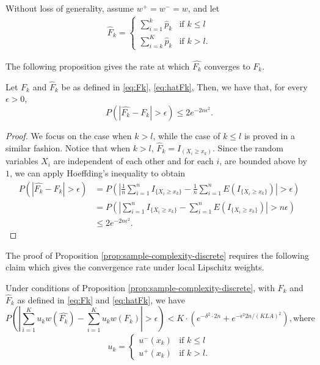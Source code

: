 Without loss of generality, assume $w^+=w^-=w$, and let
\begin{align}
\label{eq:hatFk}
\hat F_k = 
\begin{cases}
   \sum_{i=1}^k \hat p_k & \text{if   } k \leq l \\
   \sum_{i=k}^K \hat p_k & \text{if  }  k > l.
\end{cases}  
\end{align}

The following proposition gives the rate at which $\hat{F_k}$ converges to $F_k$.
\begin{proposition}
\label{prop:hoeffding-discrete}
Let $F_k$ and $\hat F_k$ be as defined in \eqref{eq:Fk}, \eqref{eq:hatFk}, Then, we have that, for every $\epsilon >0$, 
$$P(|\hat{F_k}-F_k| > \epsilon) \leq 2 e^{-2n \epsilon^2}.$$
\end{proposition}
\begin{proof}
We focus on the case when $k > l$, while the case of $k \leq l$ is proved in a similar fashion.
Notice that when $k>l$,  $\hat F_k =I_{(X_i \geq  x_k) }$. Since the random variables $X_i$ are independent of each other and  for each $i$, are bounded above by $1$, we can apply Hoeffding's inequality to obtain 
\begin{align*}
P(\left|\hat{F_k}- F_k \right| > \epsilon) & = P(\left| \frac{1}{n} \sum_{i=1}^n I_{\{X_i \geq
x_k\}} - \frac{1}{n} \sum_{i=1}^n E(I_{\{X_i \geq x_k\}}) \right| > \epsilon) \\ & = P(\left|
\sum_{i=1}^n I_{\{X_i \geq x_k\}} - \sum_{i=1}^n E(I_{\{X_i \geq x_k\}}) \right| > n\epsilon) \\ &
    \leq 2e^{-2n \epsilon^2}.
\end{align*}
\end{proof}

The proof of Proposition \ref{prop:sample-complexity-discrete} requires the following claim which gives the convergence rate under local Lipschitz weights. 

\begin{proposition}
\label{prop:discrete-first-term}
Under conditions of Proposition \ref{prop:sample-complexity-discrete}, with $F_k$ and $\hat F_k$ as defined in \eqref{eq:Fk} and \eqref{eq:hatFk},  we have
$$P(\left| \sum_{i=1}^K u_{k} w(\hat{F_k}) - \sum_{i=1}^K u_{k} w(F_k) \right| >\epsilon) < K\cdot (
e^{-\delta^2\cdot 2n} + e^{-\epsilon^2 2n/(KLA)^2}), \text{where}$$
\begin{align}
\label{eq:uplusminusxk}
u_k = 
\begin{cases}
   u^{-}(x_{k}) & \text{if   } k \leq l \\
   u^{+}(x_{k}) & \text{if  }  k > l.
\end{cases}  
\end{align} 
\end{proposition}

